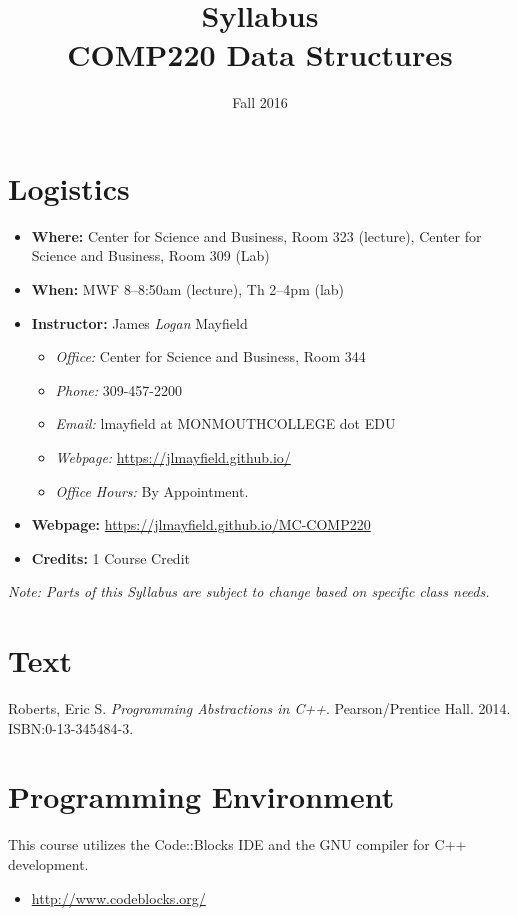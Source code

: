 \documentclass[nobib]{tufte-handout}
\title{Syllabus \\ COMP220 Data Structures}
\author{ }
\date{Fall 2016}
\begin{document}
\maketitle

\section{Logistics}
\begin{itemize}
\item \textbf{Where: } Center for Science and Business, Room 323 (lecture), Center for Science and Business, Room 309 (Lab)
\item \textbf{When: } MWF 8--8:50am (lecture), Th 2--4pm (lab)
\item \textbf{Instructor: } James \textit{Logan} Mayfield
\begin{itemize}
\item \textit{Office: } Center for Science and Business, Room 344
\item \textit{Phone: } 309-457-2200 %
\item \textit{Email: } lmayfield at MONMOUTHCOLLEGE dot EDU
\item \textit{Webpage: } \url{https://jlmayfield.github.io/}
\item \textit{Office Hours: }   By Appointment.
\end{itemize}
\item \textbf{Webpage: } \url{https://jlmayfield.github.io/MC-COMP220}
\item \textbf{Credits: } 1 Course Credit
\end{itemize}
\emph{Note: Parts of this Syllabus are subject to change based on specific class needs.}

\section{Text}
\noindent
Roberts, Eric S\@. \textit{Programming Abstractions in C++}. Pearson/Prentice Hall. 2014. ISBN:0-13-345484-3. %


\section{Programming Environment}

This course utilizes the Code::Blocks IDE and the GNU compiler for C++ development.
\begin{itemize}
\item \url{http://www.codeblocks.org/}
\end{itemize}
\end{document}
